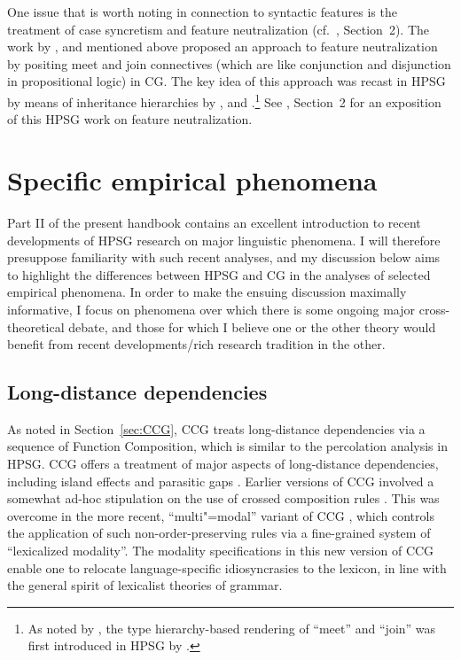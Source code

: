 \documentclass[output=paper
                ,modfonts
                ,nonflat
	        ,collection
	        ,collectionchapter
	        ,collectiontoclongg
 	        ,biblatex
                ,babelshorthands
                ,newtxmath
                ,draftmode
                ,colorlinks, citecolor=brown
]{./langsci/langscibook}
\begin{document}
One issue that is worth noting in connection to syntactic features is
the treatment of case syncretism and feature neutralization
(cf.~, Section~2). The work by
\citet{Morrill94a-u}, \citet{Bayer96} and \citet{BJ95} mentioned
above proposed an approach
to feature neutralization by positing meet and join connectives (which
are like conjunction and disjunction in propositional logic) in CG.
The key idea of this approach was recast in HPSG by means of
inheritance hierarchies by \citet{levy:01}, \citet{lev:pol:01} and
\citet{dani:01}.\footnote{As noted by \citet{levy:01}, the
  type hierarchy-based rendering of ``meet'' and ``join''
  was first introduced in HPSG by \citet{LHC2001a-u,}.} See
, Section~2 for an 
exposition of this HPSG work on feature neutralization.


\section{Specific empirical phenomena \label{phenomena}}

Part II of the present handbook contains an excellent introduction to
recent developments of HPSG research on major linguistic phenomena. I
will therefore presuppose familiarity with such recent analyses, and my discussion below aims to highlight the
differences between HPSG and CG in the analyses of selected
empirical phenomena. In order to make the ensuing discussion maximally
informative, I focus on phenomena over which there is some ongoing
major cross-theoretical debate, and those for which I believe one or
the other theory would benefit from recent developments/rich research
tradition in the other.


\subsection{Long-distance dependencies}

As noted in Section~\ref{sec:CCG}, CCG treats long-distance
dependencies via a sequence of Function Composition, which is similar
to the \slasch percolation analysis in HPSG. CCG offers a treatment of
major aspects of long-distance dependencies, including island effects
\citep{Steedman2000a-u} and parasitic gaps \citep{Steedman87a-u}.
Earlier versions of CCG involved a somewhat ad-hoc stipulation on the
use of crossed composition rules \citep{Steedman97a}. This was
overcome in the more recent, ``multi"=modal'' variant of CCG
\citep{Baldridge2002a-u}, which controls the application of such
non-order-preserving rules via a fine-grained system of
``lexicalized modality''. The modality specifications in this new version of CCG
enable one to relocate language-specific idiosyncrasies to the
lexicon, in line with the general spirit of lexicalist theories of
grammar.
\end{document}

